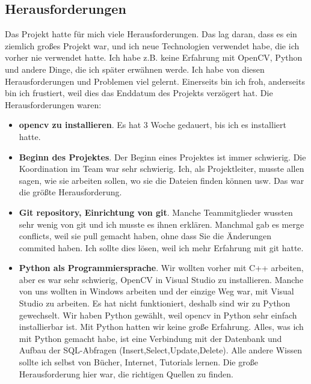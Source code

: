 \subsection{Herausforderungen}
Das Projekt hatte f\"ur mich viele Herausforderungen. Das lag daran, dass es ein ziemlich gro{\ss}es Projekt war, und ich neue Technologien verwendet habe, die ich vorher nie verwendet hatte. Ich habe z.B. keine Erfahrung mit OpenCV, Python und andere Dinge, die ich sp\"ater erw\"ahnen werde. Ich habe von diesen Herausforderungen und Problemen viel gelernt. Einerseits bin ich froh, anderseits bin ich frustiert, weil dies das Enddatum des Projekts verz\"ogert hat. 
Die Herausforderungen waren:

\begin{itemize}
	\item \textbf{opencv zu installieren}. Es hat 3 Woche gedauert, bis ich es installiert hatte. 
	
	\item \textbf{Beginn des Projektes}. Der Beginn eines Projektes ist immer schwierig. Die Koordination im Team war sehr schwierig. Ich, als Projektleiter, musste allen sagen, wie sie arbeiten sollen, wo sie die Dateien finden k\"onnen usw. Das war die gr\"o{\ss}te Herausforderung.
		
	\item \textbf{Git repository, Einrichtung von git}. Manche Teammitglieder wussten sehr wenig von git und ich musste es ihnen erkl\"aren. Manchmal gab es merge conflicts, weil sie pull gemacht haben, ohne dass Sie die \"Anderungen commited haben. Ich sollte dies l\"osen, weil ich mehr Erfahrung mit git hatte. 
	
	\item \textbf{Python als Programmiersprache}. Wir wollten vorher mit C++ arbeiten, aber es war sehr schwierig, OpenCV in Visual Studio zu installieren. Manche von uns wollten in Windows arbeiten und der einzige Weg war, mit Visual Studio zu arbeiten. Es hat nicht funktioniert, deshalb sind wir zu Python gewechselt. Wir haben Python gew\"ahlt, weil opencv in Python sehr einfach installierbar ist. Mit Python hatten wir keine gro{\ss}e Erfahrung. Alles, was ich mit Python gemacht habe, ist eine Verbindung mit der Datenbank und Aufbau der SQL-Abfragen (Insert,Select,Update,Delete). Alle andere Wissen sollte ich selbst von B\"ucher, Internet, Tutorials lernen. Die gro{\ss}e Herausforderung hier war, die richtigen Quellen zu finden.
	

\end{itemize}
